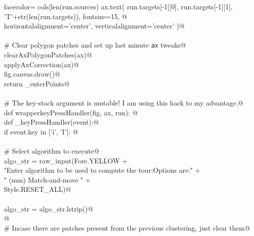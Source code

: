 \documentclass[10pt, english, oneside]{report}
\begin{document}
\begin{appendices}
\begin{flushleft}
\begin{list}{}{}
\mbox{}\verb@                                                       facecolor= cols[len(run.sources)%len(cols)], edgecolor='black', lw=1.0 ))@\\
\mbox{}\verb@                      ax.text( run.targets[-1][0], run.targets[-1][1], 'T'+str(len(run.targets)), fontsize=15, @\\
\mbox{}\verb@                               horizontalalignment='center', verticalalignment='center' )@\\
\mbox{}\verb@@\\
\mbox{}\verb@             # Clear polygon patches and set up last minute \verb|ax| tweaks@\\
\mbox{}\verb@             clearAxPolygonPatches(ax)@\\
\mbox{}\verb@             applyAxCorrection(ax)@\\
\mbox{}\verb@             fig.canvas.draw()@\\
\mbox{}\verb@      return _enterPoints@\\
\mbox{}\verb@@\\
\mbox{}\verb@    # The key-stack argument is mutable! I am using this hack to my advantage.@\\
\mbox{}\verb@    def wrapperkeyPressHandler(fig, ax, run): @\\
\mbox{}\verb@           def _keyPressHandler(event):@\\
\mbox{}\verb@               if event.key in ['i', 'I']:  @\\
\mbox{}\verb@@\\
\mbox{}\verb@                    # Select algorithm to execute@\\
\mbox{}\verb@                    algo_str = raw_input(Fore.YELLOW                                             +\@\\
\mbox{}\verb@                            "Enter algorithm to be used to compute the tour:\n Options are:\n"   +\@\\
\mbox{}\verb@                            " (mm)     Match-and-move \n"                            +\@\\
\mbox{}\verb@                            Style.RESET_ALL)@\\
\mbox{}\verb@@\\
\mbox{}\verb@                    algo_str = algo_str.lstrip()@\\
\mbox{}\verb@                     @\\
\mbox{}\verb@                    # Incase there are patches present from the previous clustering, just clear them@\\

\end{list}
\end{flushleft}
\end{appendices}
\end{document}
